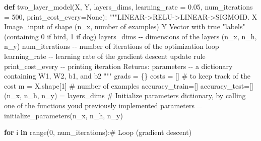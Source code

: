 \documentclass[
  letterpaper,
  DIV=11,
  numbers=noendperiod]{scrartcl}
\newenvironment{Shaded}{\begin{snugshade}}{\end{snugshade}}
\newcommand{\BuiltInTok}[1]{\textcolor[rgb]{0.00,0.23,0.31}{#1}}
\newcommand{\CommentTok}[1]{\textcolor[rgb]{0.37,0.37,0.37}{#1}}
\newcommand{\ControlFlowTok}[1]{\textcolor[rgb]{0.00,0.23,0.31}{\textbf{#1}}}
\newcommand{\DecValTok}[1]{\textcolor[rgb]{0.68,0.00,0.00}{#1}}
\newcommand{\FloatTok}[1]{\textcolor[rgb]{0.68,0.00,0.00}{#1}}
\newcommand{\KeywordTok}[1]{\textcolor[rgb]{0.00,0.23,0.31}{\textbf{#1}}}
\newcommand{\NormalTok}[1]{\textcolor[rgb]{0.00,0.23,0.31}{#1}}
\newcommand{\OperatorTok}[1]{\textcolor[rgb]{0.37,0.37,0.37}{#1}}
\newcommand{\VariableTok}[1]{\textcolor[rgb]{0.07,0.07,0.07}{#1}}
\begin{document}
\begin{Shaded}
\begin{Highlighting}[]
\KeywordTok{def}\NormalTok{ two\_layer\_model(X, Y, layers\_dims, learning\_rate }\OperatorTok{=} \FloatTok{0.05}\NormalTok{, num\_iterations }\OperatorTok{=} \DecValTok{500}\NormalTok{, print\_cost\_every}\OperatorTok{=}\VariableTok{None}\NormalTok{):}
    \CommentTok{"""LINEAR{-}\textgreater{}RELU{-}\textgreater{}LINEAR{-}\textgreater{}SIGMOID.}
\CommentTok{    X Image\_input of shape (n\_x, number of examples)}
\CommentTok{    Y Vector with true "labels" (containing 0 if bird, 1 if dog)}
\CommentTok{    layers\_dims {-}{-} dimensions of the layers (n\_x, n\_h, n\_y)}
\CommentTok{    num\_iterations {-}{-} number of iterations of the optimization loop}
\CommentTok{    learning\_rate {-}{-} learning rate of the gradient descent update rule}
\CommentTok{    print\_cost\_every {-}{-} printing iteration}
\CommentTok{    Returns:}
\CommentTok{    parameters {-}{-} a dictionary containing W1, W2, b1, and b2}
\CommentTok{    """}
\NormalTok{    grads }\OperatorTok{=}\NormalTok{ \{\}}
\NormalTok{    costs }\OperatorTok{=}\NormalTok{ []                              }\CommentTok{\# to keep track of the cost}
\NormalTok{    m }\OperatorTok{=}\NormalTok{ X.shape[}\DecValTok{1}\NormalTok{]                           }\CommentTok{\# number of examples}
\NormalTok{    accuracy\_train}\OperatorTok{=}\NormalTok{[]}
\NormalTok{    accuracy\_test}\OperatorTok{=}\NormalTok{[]}
\NormalTok{    (n\_x, n\_h, n\_y) }\OperatorTok{=}\NormalTok{ layers\_dims}
    \CommentTok{\# Initialize parameters dictionary, by calling one of the functions you\textquotesingle{}d previously implemented}
\NormalTok{    parameters }\OperatorTok{=}\NormalTok{ initialize\_parameters(n\_x, n\_h, n\_y)}
    
    \ControlFlowTok{for}\NormalTok{ i }\KeywordTok{in} \BuiltInTok{range}\NormalTok{(}\DecValTok{0}\NormalTok{, num\_iterations):}\CommentTok{\# Loop (gradient descent)}
        

\end{Highlighting}
\end{Shaded}
\end{document}
